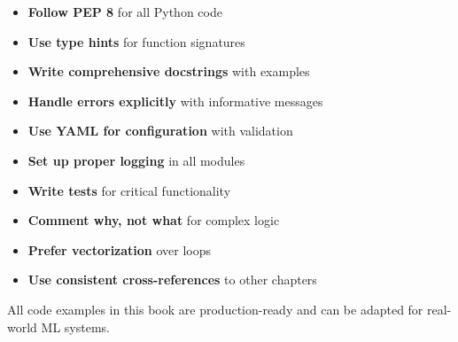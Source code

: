 \begin{itemize}
    \item \textbf{Follow PEP 8} for all Python code
    \item \textbf{Use type hints} for function signatures
    \item \textbf{Write comprehensive docstrings} with examples
    \item \textbf{Handle errors explicitly} with informative messages
    \item \textbf{Use YAML for configuration} with validation
    \item \textbf{Set up proper logging} in all modules
    \item \textbf{Write tests} for critical functionality
    \item \textbf{Comment why, not what} for complex logic
    \item \textbf{Prefer vectorization} over loops
    \item \textbf{Use consistent cross-references} to other chapters
\end{itemize}

All code examples in this book are production-ready and can be adapted for real-world ML systems.
